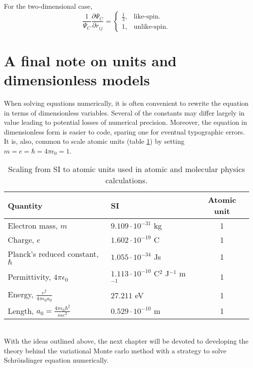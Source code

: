 For the two-dimensional case\cite{Albrigtsen}, 
\begin{equation}\label{cusp2D}
\boxed{\frac{1}{\Psi_C}\frac{\partial \Psi_C}{\partial r_{ij}} = \begin{cases} \frac{1}{3}, & \text{like-spin.} \\
1, & \text{unlike-spin.}\end{cases}}
\end{equation}


\section{A final note on units and dimensionless models}
When solving equations numerically, it is often convenient to rewrite the equation in terms of dimensionless variables. Several of the constants may differ largely in value leading to potential losses of numerical precision. Moreover, the equation in dimensionless form is easier to code, sparing one for eventual typographic errors. It is, also, common to scale atomic units (table \ref{atomicUnits}) by setting $m=e=\hbar=4\pi\epsilon_0=1$.\\
\begin{table}[hbtp]
\begin{center} 
\begin{tabular}{llc}
\toprule[1pt]
{\bf Quantity}                 & {\bf SI}               & {\bf Atomic unit}\\
\midrule[1pt]
Electron mass, $m$               & $9.109\cdot 10^{-31}$ kg & 1 \\
Charge, $e$                      & $1.602\cdot 10^{-19}$ C  & 1 \\
Planck's reduced constant, $\hbar$& $1.055\cdot 10^{-34}$ Js& 1 \\       
Permittivity, $4\pi\epsilon_0$   & $1.113\cdot 10^{-10}$ C$^2$ J$^{-1}$ m$^{-1}$&1\\
Energy, $\frac{e^2}{4\pi\epsilon_0 a_0}$ & $27.211$ eV       & 1 \\
Length, $a_0=\frac{4\pi\epsilon_0 \hbar^2}{me^2}$&$0.529\cdot10^{-10}$ m&1\\
\bottomrule[1pt]
\end{tabular} 
\end{center}
\caption{Scaling from SI to atomic units used in atomic and molecular physics calculations.}
\label{atomicUnits}
\end{table}
\\
With the ideas outlined above, the next chapter will be devoted to developing the theory behind the variational Monte carlo method with a strategy to solve Schr\"ondinger equation numerically.


